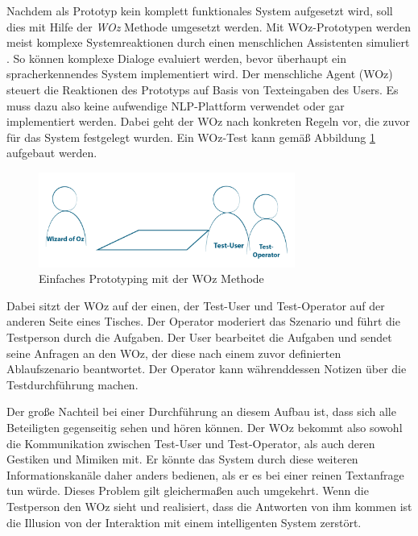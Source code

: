 Nachdem als Prototyp kein komplett funktionales System aufgesetzt wird, soll dies mit Hilfe der \textit{\ac{WOz}} Methode umgesetzt werden. Mit \ac{WOz}-Prototypen werden meist komplexe Systemreaktionen durch  einen menschlichen Assistenten simuliert \cite[S. 342]{weber_kompendium_2008}. So können komplexe Dialoge evaluiert werden, bevor überhaupt ein spracherkennendes System implementiert wird. Der menschliche Agent (\acl{WOz}) steuert die Reaktionen des Prototyps auf Basis von Texteingaben des Users. Es muss dazu also keine aufwendige \ac{NLP}-Plattform verwendet oder gar implementiert werden. Dabei geht der \ac{WOz} nach konkreten Regeln vor, die zuvor für das System festgelegt wurden. Ein \ac{WOz}-Test kann gemäß Abbildung \ref{fig:wizard-of-oz-v1} aufgebaut werden.
\newline

\begin{figure}[htb]
    \centering
    \includegraphics[width=0.75\textwidth]{bilder/WizardOfOz_v1.png}
    \caption{Einfaches Prototyping mit der \acl{WOz} Methode}
    \label{fig:wizard-of-oz-v1}
\end{figure}

Dabei sitzt der \acl{WOz} auf der einen, der Test-User und Test-Operator auf der anderen Seite eines Tisches. Der Operator moderiert das Szenario und führt die Testperson durch die Aufgaben. Der User bearbeitet die Aufgaben und sendet seine Anfragen an den \ac{WOz}, der diese nach einem zuvor definierten Ablaufszenario beantwortet. Der Operator kann währenddessen Notizen über die Testdurchführung machen.

Der große Nachteil bei einer Durchführung an diesem Aufbau ist, dass sich alle Beteiligten gegenseitig sehen und hören können. Der \acl{WOz} bekommt also sowohl die Kommunikation zwischen Test-User und Test-Operator, als auch deren Gestiken und Mimiken mit. Er könnte das System durch diese weiteren Informationskanäle daher anders bedienen, als er es bei einer reinen Textanfrage tun würde. Dieses Problem gilt gleichermaßen auch umgekehrt. Wenn die Testperson den \ac{WOz} sieht und realisiert, dass die Antworten von ihm kommen ist die Illusion von der Interaktion mit einem intelligenten System zerstört. \cite{bluemm_designing_2017} 

